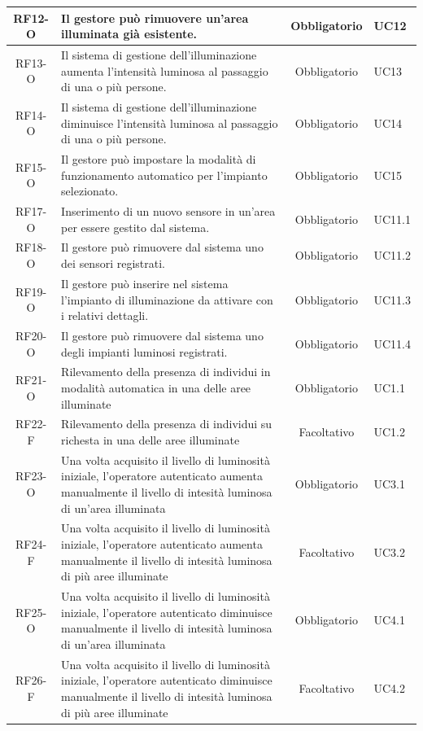 \documentclass[a4paper, 12pt]{article}
\begin{document}
\begin{longtable}{|c|p{7cm}|c|p{4cm}|}
    \hline
    RF12-O & Il gestore può rimuovere un'area illuminata già esistente. & Obbligatorio & UC12 \\
    \hline
    RF13-O & Il sistema di gestione dell'illuminazione aumenta l'intensità luminosa al passaggio di una o più persone. & Obbligatorio & UC13 \\
    \hline
    RF14-O & Il sistema di gestione dell'illuminazione diminuisce l'intensità luminosa al passaggio di una o più persone. & Obbligatorio & UC14 \\
    \hline
    RF15-O & Il gestore può impostare la modalità di funzionamento automatico per l'impianto selezionato. & Obbligatorio & UC15 \\
    \hline
    RF17-O & Inserimento di un nuovo sensore in un'area per essere gestito dal sistema. & Obbligatorio & UC11.1 \\
    \hline
    RF18-O & Il gestore può rimuovere dal sistema uno dei sensori registrati. & Obbligatorio & UC11.2\\
    \hline
    RF19-O & Il gestore può inserire nel sistema l'impianto di illuminazione da attivare con i relativi dettagli. & Obbligatorio & UC11.3\\
    \hline
    RF20-O & Il gestore può rimuovere dal sistema uno degli impianti luminosi registrati. & Obbligatorio & UC11.4 \\
    \hline
    RF21-O & Rilevamento della presenza di individui in modalità automatica in una delle aree illuminate & Obbligatorio & UC1.1 \\
    \hline
    RF22-F & Rilevamento della presenza di individui su richesta in una delle aree illuminate & Facoltativo & UC1.2 \\
    \hline
    RF23-O & Una volta acquisito il livello di luminosità iniziale, l'operatore autenticato aumenta manualmente il livello di intesità luminosa di un'area illuminata & Obbligatorio & UC3.1 \\
    \hline
    RF24-F & Una volta acquisito il livello di luminosità iniziale, l'operatore autenticato aumenta manualmente il livello di intesità luminosa di più aree illuminate & Facoltativo & UC3.2 \\
    \hline
    RF25-O & Una volta acquisito il livello di luminosità iniziale, l'operatore autenticato diminuisce manualmente il livello di intesità luminosa di un'area illuminata & Obbligatorio & UC4.1 \\
    \hline
    RF26-F & Una volta acquisito il livello di luminosità iniziale, l'operatore autenticato diminuisce manualmente il livello di intesità luminosa di più aree illuminate & Facoltativo & UC4.2 \\

\end{longtable}
\end{document}
